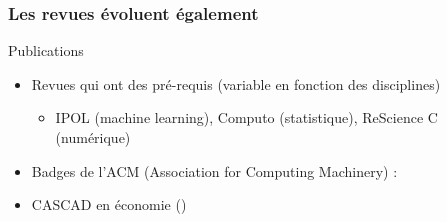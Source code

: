 \begin{frame}
  \frametitle{Les revues évoluent également}

\begin{block}{Publications}
 \begin{itemize}\footnotesize
 \item Revues qui ont des pré-requis (variable en fonction des disciplines)
   \begin{itemize}\footnotesize
   \item IPOL (machine learning), Computo (statistique), ReScience C (numérique) 
   \end{itemize}  
 \item Badges de l'ACM (Association for Computing Machinery) : 
 \item CASCAD en économie ()
 \end{itemize} 
\end{block}
%
\end{frame}




